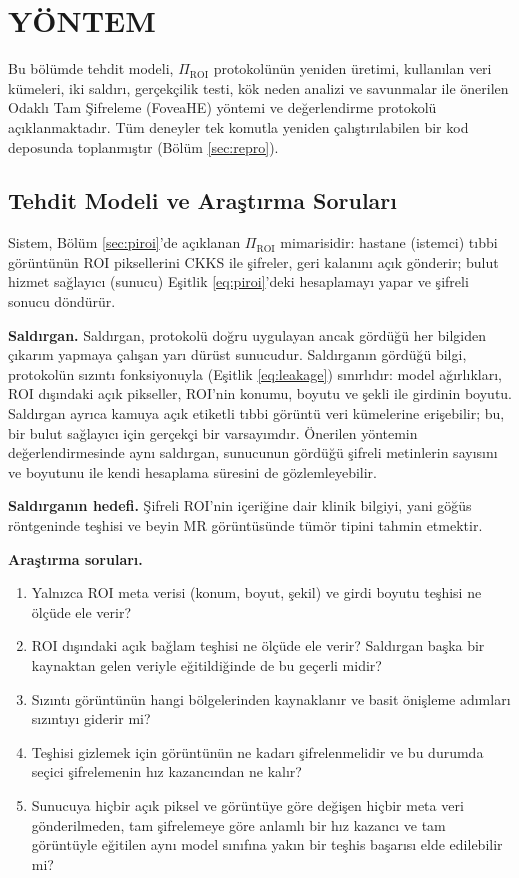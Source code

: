 \chapter{YÖNTEM}\label{CH3}

Bu bölümde tehdit modeli, $\Pi_{\mathrm{ROI}}$ protokolünün yeniden üretimi, kullanılan veri kümeleri, iki saldırı, gerçekçilik testi, kök neden analizi ve savunmalar ile önerilen Odaklı Tam Şifreleme (FoveaHE) yöntemi ve değerlendirme protokolü açıklanmaktadır. Tüm deneyler tek komutla yeniden çalıştırılabilen bir kod deposunda toplanmıştır (Bölüm \ref{sec:repro}).

\section{Tehdit Modeli ve Araştırma Soruları}\label{sec:threat}

Sistem, Bölüm \ref{sec:piroi}'de açıklanan $\Pi_{\mathrm{ROI}}$ mimarisidir: hastane (istemci) tıbbi görüntünün ROI piksellerini CKKS ile şifreler, geri kalanını açık gönderir; bulut hizmet sağlayıcı (sunucu) Eşitlik \ref{eq:piroi}'deki hesaplamayı yapar ve şifreli sonucu döndürür.

\textbf{Saldırgan.} Saldırgan, protokolü doğru uygulayan ancak gördüğü her bilgiden çıkarım yapmaya çalışan yarı dürüst sunucudur. Saldırganın gördüğü bilgi, protokolün sızıntı fonksiyonuyla (Eşitlik \ref{eq:leakage}) sınırlıdır: model ağırlıkları, ROI dışındaki açık pikseller, ROI'nin konumu, boyutu ve şekli ile girdinin boyutu. Saldırgan ayrıca kamuya açık etiketli tıbbi görüntü veri kümelerine erişebilir; bu, bir bulut sağlayıcı için gerçekçi bir varsayımdır. Önerilen yöntemin değerlendirmesinde aynı saldırgan, sunucunun gördüğü şifreli metinlerin sayısını ve boyutunu ile kendi hesaplama süresini de gözlemleyebilir.

\textbf{Saldırganın hedefi.} Şifreli ROI'nin içeriğine dair klinik bilgiyi, yani göğüs röntgeninde teşhisi ve beyin MR görüntüsünde tümör tipini tahmin etmektir.

\textbf{Araştırma soruları.}
\begin{enumerate}
\item[\textbf{AS1.}] Yalnızca ROI meta verisi (konum, boyut, şekil) ve girdi boyutu teşhisi ne ölçüde ele verir?
\item[\textbf{AS2.}] ROI dışındaki açık bağlam teşhisi ne ölçüde ele verir? Saldırgan başka bir kaynaktan gelen veriyle eğitildiğinde de bu geçerli midir?
\item[\textbf{AS3.}] Sızıntı görüntünün hangi bölgelerinden kaynaklanır ve basit önişleme adımları sızıntıyı giderir mi?
\item[\textbf{AS4.}] Teşhisi gizlemek için görüntünün ne kadarı şifrelenmelidir ve bu durumda seçici şifrelemenin hız kazancından ne kalır?
\item[\textbf{AS5.}] Sunucuya hiçbir açık piksel ve görüntüye göre değişen hiçbir meta veri gönderilmeden, tam şifrelemeye göre anlamlı bir hız kazancı ve tam görüntüyle eğitilen aynı model sınıfına yakın bir teşhis başarısı elde edilebilir mi?
\end{enumerate}


